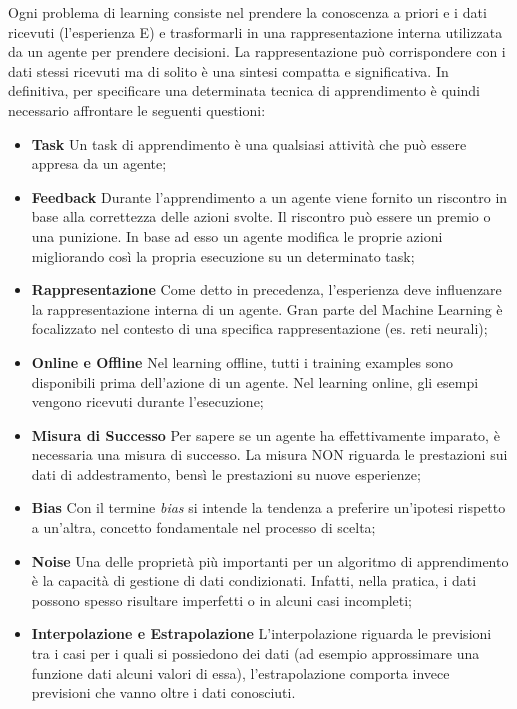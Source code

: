 Ogni problema di learning consiste nel prendere la conoscenza a priori e i dati ricevuti (l'esperienza E) e 
trasformarli in una rappresentazione  interna utilizzata da un agente per prendere decisioni. La rappresentazione
può corrispondere con i dati stessi ricevuti ma di solito è una sintesi compatta e significativa. 
In definitiva, per specificare una determinata tecnica di apprendimento è quindi necessario affrontare le seguenti\cite{PooleMackworth17} questioni:
\begin{itemize}
  \item \textbf{Task} Un task di apprendimento è una qualsiasi attività che può essere appresa da un agente;
  \item \textbf{Feedback} Durante l'apprendimento a un agente viene fornito un riscontro in base alla correttezza delle azioni svolte. Il riscontro può essere un premio o una punizione.  In base ad esso un agente modifica le proprie azioni
  migliorando così la propria esecuzione su un determinato task;
  \item \textbf{Rappresentazione} Come detto in precedenza, l'esperienza deve influenzare la rappresentazione interna di un agente.
  Gran parte del Machine Learning è focalizzato nel contesto di una specifica rappresentazione (es. reti neurali);
  \item \textbf{Online e Offline} Nel learning offline, tutti i training examples sono disponibili prima dell'azione di un agente. Nel learning online,
  gli esempi vengono ricevuti durante l'esecuzione;
  \item \textbf{Misura di Successo} Per sapere se un agente ha effettivamente imparato, è necessaria una misura di successo. La misura NON riguarda le prestazioni sui dati di addestramento, bensì le prestazioni su nuove esperienze;
  \item \textbf{Bias} Con il termine \emph{bias} si intende la tendenza a preferire un'ipotesi rispetto a un'altra, concetto fondamentale nel processo di scelta;
  \item \textbf{Noise} Una delle proprietà più importanti per un algoritmo di apprendimento è la capacità di gestione di dati condizionati.
  Infatti, nella pratica, i dati possono spesso risultare imperfetti o in alcuni casi incompleti;
  \item \textbf{Interpolazione e Estrapolazione} L'interpolazione riguarda le previsioni tra i  casi per i quali si possiedono dei dati (ad esempio approssimare una funzione dati alcuni valori di essa), l'estrapolazione comporta invece 
  previsioni che vanno oltre i dati conosciuti.
\end{itemize}
